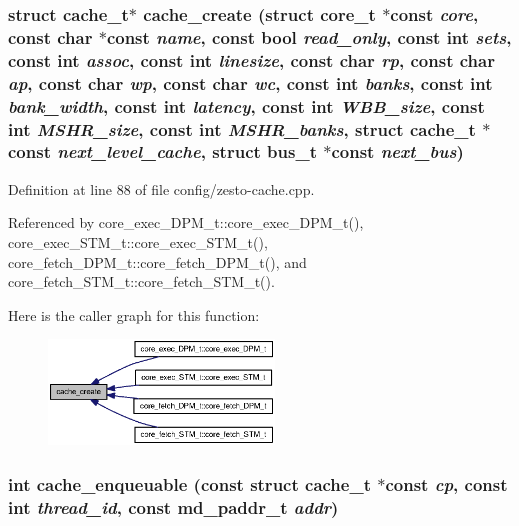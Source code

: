 \subsubsection[{cache\_\-create}]{\setlength{\rightskip}{0pt plus 5cm}struct {\bf cache\_\-t}$\ast$ cache\_\-create (struct {\bf core\_\-t} $\ast$const  {\em core}, \/  const char $\ast$const  {\em name}, \/  const bool {\em read\_\-only}, \/  const int {\em sets}, \/  const int {\em assoc}, \/  const int {\em linesize}, \/  const char {\em rp}, \/  const char {\em ap}, \/  const char {\em wp}, \/  const char {\em wc}, \/  const int {\em banks}, \/  const int {\em bank\_\-width}, \/  const int {\em latency}, \/  const int {\em WBB\_\-size}, \/  const int {\em MSHR\_\-size}, \/  const int {\em MSHR\_\-banks}, \/  struct {\bf cache\_\-t} $\ast$const  {\em next\_\-level\_\-cache}, \/  struct {\bf bus\_\-t} $\ast$const  {\em next\_\-bus})\hspace{0.3cm}{\tt  [read]}}\label{config_2zesto-cache_8cpp_76fc9319bafb600695d818375fe21ea3}




Definition at line 88 of file config/zesto-cache.cpp.

Referenced by core\_\-exec\_\-DPM\_\-t::core\_\-exec\_\-DPM\_\-t(), core\_\-exec\_\-STM\_\-t::core\_\-exec\_\-STM\_\-t(), core\_\-fetch\_\-DPM\_\-t::core\_\-fetch\_\-DPM\_\-t(), and core\_\-fetch\_\-STM\_\-t::core\_\-fetch\_\-STM\_\-t().

Here is the caller graph for this function:\nopagebreak
\begin{figure}[H]
\begin{center}
\leavevmode
\includegraphics[width=170pt]{config_2zesto-cache_8cpp_76fc9319bafb600695d818375fe21ea3_icgraph}
\end{center}
\end{figure}
\subsubsection[{cache\_\-enqueuable}]{\setlength{\rightskip}{0pt plus 5cm}int cache\_\-enqueuable (const struct {\bf cache\_\-t} $\ast$const  {\em cp}, \/  const int {\em thread\_\-id}, \/  const {\bf md\_\-paddr\_\-t} {\em addr})}\label{config_2zesto-cache_8cpp_35c7c82c117f5713ec55d40f831060da}




